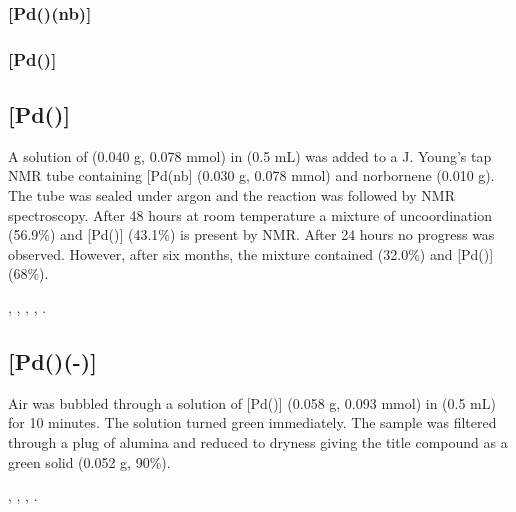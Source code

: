 \subsubsection*{[Pd(\tBuxantphos)(nb)]}


\subsubsection*{[Pd(\tBuxantphos)]}


\subsection*{[Pd(\tBusixantphos)]}

A solution of \tBusixantphos{} (0.040 g, 0.078 mmol) in  (0.5 mL) was added to a J. Young's tap NMR tube containing [Pd(nb] (0.030 g, 0.078 mmol) and norbornene (0.010 g).  The tube was sealed under argon and the reaction was followed by NMR spectroscopy.  After 48 hours at room temperature a mixture of uncoordination \tBusixantphos{} (56.9\%) and [Pd(\tBusixantphos)] (43.1\%) is present by \phosphorus{} NMR.  After 24 hours no progress was observed.  However, after six months, the mixture contained \tBusixantphos{} (32.0\%) and [Pd(\tBusixantphos)] (68\%).  

,
,
,
,
.

\subsection*{[Pd(\tButhixantphos)(-)]}

Air was bubbled through a solution of [Pd(\tButhixantphos)] (0.058 g, 0.093 mmol) in  (0.5 mL) for 10 minutes.  The solution turned green immediately.  The sample was filtered through a plug of alumina and reduced to dryness giving the title compound as a green solid (0.052 g, 90\%).

,
,
,
.

